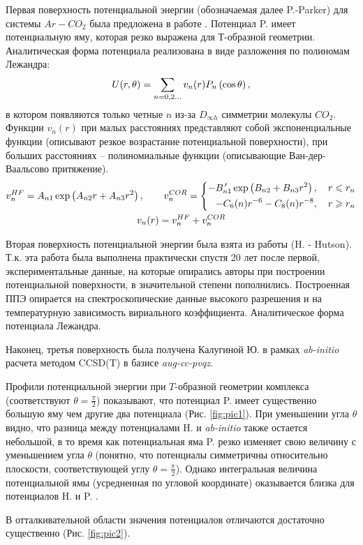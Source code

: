 Первая поверхность потенциальной энергии (обозначаемая далее P.-Parker) для системы $Ar-CO_2$ была предложена в работе \cite{parker1976}. Потенциал P. имеет потенциальную яму, которая резко выражена для Т-образной геометрии. Аналитическая форма потенциала реализована в виде разложения по полиномам Лежандра:
\vverh
\begin{gather}
	U(r, \theta) = \sum_{n = 0, 2 \dots} v_n(r) P_n \left( \cos \theta \right), \notag
\end{gather}
в котором появляются только четные $n$ из-за $D_{\infty h}$ симметрии молекулы $CO_2$. Функции $v_n(r)$ при малых расстояниях представляют собой экспоненциальные функции (описывают резкое возрастание потенциальной поверхности), при больших расстояниях -- полиномиальные функции (описывающие Ван-дер-Ваальсово притяжение). 
\vverh
\begin{gather}
	v_n^{HF} = A_{n1} \exp \left( A_{n2} r + A_{n3} r^2 \right), \notag \quad \quad 
	v_n^{COR} = \left\{
	\begin{aligned}
		- B_{n1}^{\, \prime} \exp \left( B_{n2} + B_{n3} r^2 \right), \quad r \leqslant r_n \\
		-C_6(n) r^{-6} - C_8(n) r^{-8}, \quad r \geqslant r_n
	\end{aligned} \right. \notag \\
	v_n(r) = v_n^{HF} + v_n^{COR} \notag 
\end{gather}

Вторая поверхность потенциальной энергии была взята из работы \cite{hutson1996} (H. - Hutson). Т.к. эта работа была выполнена практически спустя 20 лет после первой, экспериментальные данные, на которые опирались авторы при построении потенциальной поверхности, в значительной степени пополнились. Построенная ППЭ опирается на спектроскопические данные высокого разрешения и на температурную зависимость вириального коэффициента. Аналитическое форма потенциала Лежандра.  

Наконец, третья поверхность была получена Калугиной Ю. в рамках \textit{ab-initio} расчета методом CCSD(T) в базисе \textit{aug-cc-pvqz}.

Профили потенциальной энергии при $T$-образной геометрии комплекса (соответствуют $\theta = \frac{\pi}{2}$) показывают, что потенциал P. имеет существенно большую яму чем другие два потенциала (Рис. \ref{fig:pic1}). При уменьшении угла $\theta$ видно, что разница между потенциалами H. и \textit{ab-initio} также остается небольшой, в то время как потенциальная яма P. резко изменяет свою величину с уменьшением угла $\theta$ (понятно, что потенциалы симметричны относительно плоскости, соответствующей углу $\theta = \frac{\pi}{2}$). Однако интегральная величина потенциальной ямы (усредненная по угловой координате) оказывается близка для потенциалов H. и P. \cite{hutson1996}. \par
В отталкивательной области значения потенциалов отличаются достаточно существенно (Рис. \ref{fig:pic2}).

